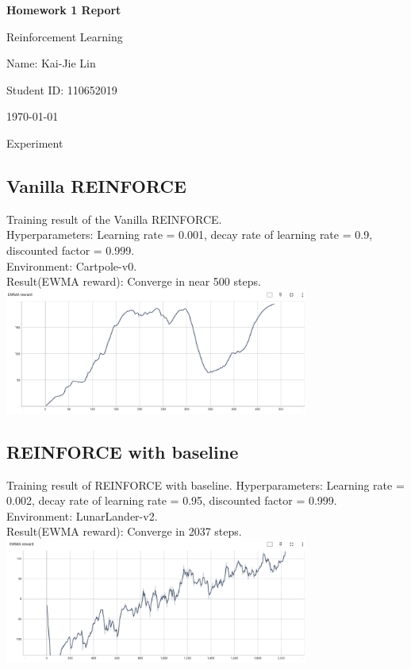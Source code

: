 \documentclass{article} %
\newcommand{\question}[2][]{\begin{flushleft}\textbf{Question #1}: \textit{#2}\end{flushleft}}
\newcommand{\maketitletwo}[2][]{\begin{center}
        \Large{\textbf{Homework 1 Report}
        
            Reinforcement Learning} %
        \vspace{5pt}
        
        \normalsize{
            Name: Kai-Jie Lin 
            
            Student ID: 110652019
            
            \today}
        \vspace{15pt}
        \end{center}}
\begin{document}
    \maketitletwo[5]  %
    
    \section{Experiment}
    \subsection{Vanilla REINFORCE}
    Training result of the Vanilla REINFORCE. \\
    Hyperparameters: Learning rate = 0.001, decay rate of learning rate = 0.9, discounted factor = 0.999. \\
    Environment: Cartpole-v0.\\
    Result(EWMA reward): Converge in near 500 steps.\\
    \includegraphics[width=10cm]{./imgs/vannila.png}
    \subsection{REINFORCE with baseline}
    Training result of REINFORCE with baseline. 
    Hyperparameters: Learning rate = 0.002, decay rate of learning rate = 0.95, discounted factor = 0.999. \\
    Environment: LunarLander-v2.\\
    Result(EWMA reward): Converge in 2037 steps.\\
    \includegraphics[width=10cm]{./imgs/baseline.png}
\end{document}
